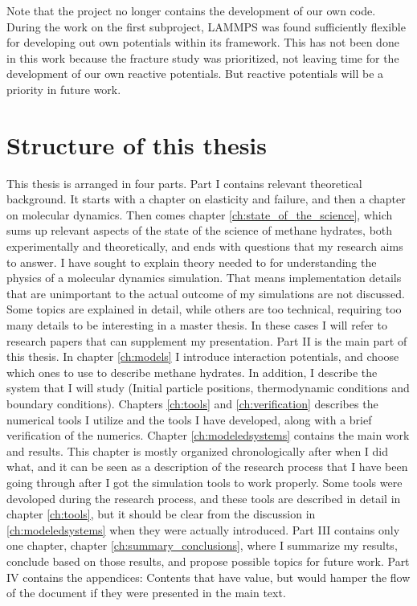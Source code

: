 Note that the project no longer contains the development of our own code. During the work on the first subproject, LAMMPS was found sufficiently flexible for developing out own potentials within its framework. This has not been done in this work because the fracture study was prioritized, not leaving time for the development of our own reactive potentials. But reactive potentials will be a priority in future work.

\section{Structure of this thesis}

This thesis is arranged in four parts. Part I contains relevant theoretical background. It starts with a chapter on elasticity and failure, and then a chapter on molecular dynamics. Then comes chapter \ref{ch:state_of_the_science}, which sums up relevant aspects of the state of the science of methane hydrates, both experimentally and theoretically, and ends with questions that my research aims to answer.
I have sought to explain theory needed to for understanding the physics of a molecular dynamics simulation. That means implementation details that are unimportant to the actual outcome of my simulations are not discussed. Some topics are explained in detail, while others are too technical, requiring too many details to be interesting in a master thesis. In these cases I will refer to research papers that can supplement my presentation. Part II is the main part of this thesis. In chapter \ref{ch:models} I introduce interaction potentials, and choose which ones to use to describe methane hydrates. In addition, I describe the system that I will study (Initial particle positions, thermodynamic conditions and boundary conditions). Chapters \ref{ch:tools} and \ref{ch:verification} describes the numerical tools I utilize and the tools I have developed, along with a brief verification of the numerics. Chapter \ref{ch:modeledsystems} contains the main work and results. This chapter is mostly organized chronologically after when I did what, and it can be seen as a description of the research process that I have been going through after I got the simulation tools to work properly. Some tools were devoloped during the research process, and these tools are described in detail in chapter \ref{ch:tools}, but it should be clear from the discussion in \ref{ch:modeledsystems} when they were actually introduced. Part III contains only one chapter, chapter \ref{ch:summary_conclusions}, where I summarize my results, conclude based on those results, and propose possible topics for future work. Part IV contains the appendices: Contents that have value, but would hamper the flow of the document if they were presented in the main text.


